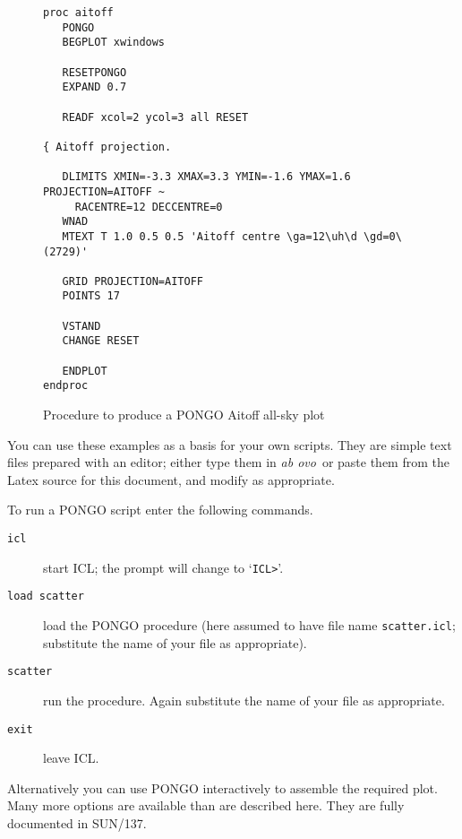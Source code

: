 \documentclass[twoside,11pt]{article}
\newcommand{\xref}[3]{#1}
\renewcommand{\_}{\texttt{\symbol{95}}}
\begin{document}
\begin{figure}[htbp]

\begin{verbatim}
proc aitoff
   PONGO
   BEGPLOT xwindows

   RESETPONGO
   EXPAND 0.7

   READF xcol=2 ycol=3 all RESET

{ Aitoff projection.

   DLIMITS XMIN=-3.3 XMAX=3.3 YMIN=-1.6 YMAX=1.6 PROJECTION=AITOFF ~
     RACENTRE=12 DECCENTRE=0
   WNAD
   MTEXT T 1.0 0.5 0.5 'Aitoff centre \ga=12\uh\d \gd=0\(2729)'

   GRID PROJECTION=AITOFF
   POINTS 17

   VSTAND
   CHANGE RESET

   ENDPLOT
endproc
\end{verbatim}

\caption{Procedure to produce a PONGO Aitoff all-sky plot}
\label{PONGO_AITOFF}

\end{figure}

You can use these examples as a basis for your own scripts. They are
simple text files prepared with an editor; either type them in {\it
ab ovo}\, or paste them from the Latex source for this document, and
modify as appropriate.

To run a PONGO script enter the following commands.

\begin{description}

  \item[ {\tt icl} ] start ICL; the prompt will change to `{\tt ICL>}'.

  \item[ {\tt load scatter} ] load the PONGO procedure (here assumed to
   have file name {\tt scatter.icl}; substitute the name of your file
   as appropriate).

  \item[ {\tt scatter} ] run the procedure. Again substitute the name
   of your file as appropriate.

  \item[ {\tt exit} ] leave ICL.

\end{description}

Alternatively you can use PONGO interactively to assemble the required
plot. Many more options are available than are described here. They
are fully documented in \xref{SUN/137}{sun137}{}.
\end{document}
